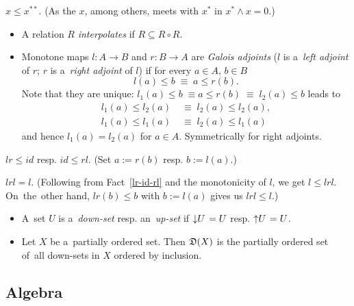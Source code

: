 \begin{fact}
  $x \le x^{**}$.
  (As the $x$, among others, meets with $x^*$ in $x^* \wedge x = 0$.)
\end{fact}

\begin{itemize}
\item A relation $R$ \emph{interpolates} if $R \subseteq R \circ R$.

\item Monotone maps $l\colon A \to B$ and $r\colon B \to A$ are \emph{Galois
  adjoints\/} ($l$ is a~\emph{left adjoint\/} of $r$; $r$ is a~\emph{right
  adjoint\/} of $l$) if for every $a\in A, \, b\in B$
  \[
    l(a) \le b \; \equiv \; a \le r(b).
  \]
  Note that they are unique: $l_1(a) \le b \; \equiv a \le r(b) \; \equiv \;
  l_2(a) \le b$ leads to
  \begin{align*}
    l_1(a) \le l_2(a) \; &\equiv \; l_2(a) \le l_2(a), \\
    l_1(a) \le l_1(a) \; &\equiv \; l_2(a) \le l_1(a)
  \end{align*}
  and hence $l_1(a) = l_2(a)$ for $a\in A$.
  Symmetrically for right adjoints.
\end{itemize}

\begin{fact} \label{lr-id-rl}
  $lr \le id$ resp. $id \le rl$.
  (Set $a := r(b)$ resp. $b := l(a)$.)
\end{fact}

\begin{fact} \label{lrl=l}
  $lrl = l$.
  (Following from Fact~\ref{lr-id-rl} and the monotonicity of $l$, we get $l
   \le lrl$.
  On~the~other hand, $lr(b) \le b$ with $b := l(a)$ gives us $lrl \le l$.)
\end{fact}

\begin{itemize}
\item A~set $U$ is a~\emph{down-set\/} resp. an~\emph{up-set\/} if
$\left\downarrow U \right. = U$ resp. $\left\uparrow U \right. = U$.

\item Let $X$ be a~partially ordered set.
Then $\mathfrak{D}(X)$ is the partially ordered set of~all down-sets in $X$ ordered by
inclusion.

\end{itemize}

\subsection*{Algebra}

